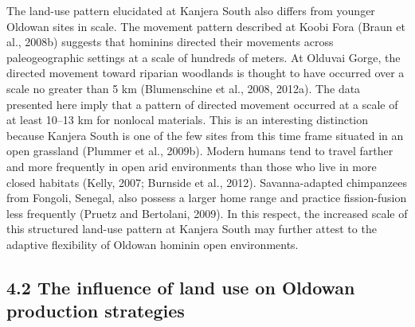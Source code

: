 \documentclass[]{elsarticle} %
\begin{document}
The land-use pattern elucidated at Kanjera South also differs from
younger Oldowan sites in scale. The movement pattern described at Koobi
Fora (\hspace{0pt}Braun et al., 2008b\hspace{0pt}) suggests that
hominins directed their movements across paleogeographic settings at a
scale of hundreds of meters. At Olduvai Gorge, the directed movement
toward riparian woodlands is thought to have occurred over a scale no
greater than 5 km (\hspace{0pt}Blumenschine et al., 2008\hspace{0pt},
\hspace{0pt}2012a\hspace{0pt}). The data presented here imply that a
pattern of directed movement occurred at a scale of at least 10--13 km
for nonlocal materials. This is an interesting distinction because
Kanjera South is one of the few sites from this time frame situated in
an open grassland (\hspace{0pt}Plummer et al., 2009b\hspace{0pt}).
Modern humans tend to travel farther and more frequently in open arid
environments than those who live in more closed habitats
(\hspace{0pt}Kelly, 2007\hspace{0pt}; \hspace{0pt}Burnside et al.,
2012\hspace{0pt}). Savanna-adapted chimpanzees from Fongoli, Senegal,
also possess a larger home range and practice fission-fusion less
frequently (\hspace{0pt}Pruetz and Bertolani, 2009\hspace{0pt}). In this
respect, the increased scale of this structured land-use pattern at
Kanjera South may further attest to the adaptive flexibility of Oldowan
hominin open environments.

\hypertarget{the-influence-of-land-use-on-oldowan-production-strategies}{%
\subsection{4.2 The influence of land use on Oldowan production
strategies}\label{the-influence-of-land-use-on-oldowan-production-strategies}}
\end{document}
